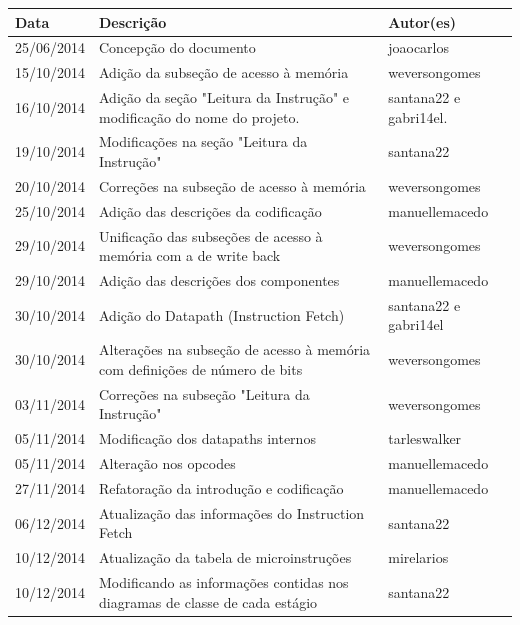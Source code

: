 \documentclass{report}
\begin{document}
\begin{table}[h!]
\begin{longtable}[pos]{|m{2cm} | m{7.2cm} | m{3.8cm}|}
\textbf{Data} & \cellcolor[gray]{0.9}\textbf{Descrição} & \cellcolor[gray]{0.9} \textbf{Autor(es)}\\ \hline
      \small 25/06/2014 & \small Concepção do documento & \small joaocarlos \\ \hline
      \small 15/10/2014 & \small Adição da subseção de acesso à memória & \small weversongomes \\ \hline
      \small 16/10/2014 & \small Adição da seção "Leitura da Instrução" e modificação do nome do projeto. & \small santana22 e gabri14el.\\ \hline
      \small 19/10/2014 & \small Modificações na seção "Leitura da Instrução" & \small santana22 \\ \hline
      \small 20/10/2014 & \small Correções na subseção de acesso à memória & \small weversongomes \\ \hline
      \small 25/10/2014 & \small Adição das descrições da codificação & \small manuellemacedo \\ \hline
      \small 29/10/2014 & \small Unificação das subseções de acesso à memória com a de write back & \small weversongomes \\ \hline
      \small 29/10/2014 & \small Adição das descrições dos componentes & \small manuellemacedo \\ \hline
      \small 30/10/2014 & \small Adição do Datapath (Instruction Fetch) & \small santana22 e gabri14el \\ \hline
      \small 30/10/2014 & \small Alterações na subseção de acesso à memória com definições de número de bits & \small weversongomes \\ \hline
      \small 03/11/2014 & \small Correções na subseção "Leitura da Instrução" & \small weversongomes \\ \hline
      \small 05/11/2014 & \small Modificação dos datapaths internos & \small tarleswalker \\ \hline
      \small 05/11/2014 & \small Alteração nos opcodes & \small manuellemacedo \\ \hline
      \small 27/11/2014 & \small Refatoração da introdução e codificação & \small manuellemacedo \\ \hline
      \small 06/12/2014 & \small Atualização das informações do Instruction Fetch & \small santana22 \\ \hline
      \small 10/12/2014 & \small Atualização da tabela de microinstruções  & \small mirelarios \\ \hline
      \small 10/12/2014 & \small Modificando as informações contidas nos diagramas de classe de cada estágio  & \small  santana22 \\ \hline

\end{longtable}
\end{table}
\end{document}
